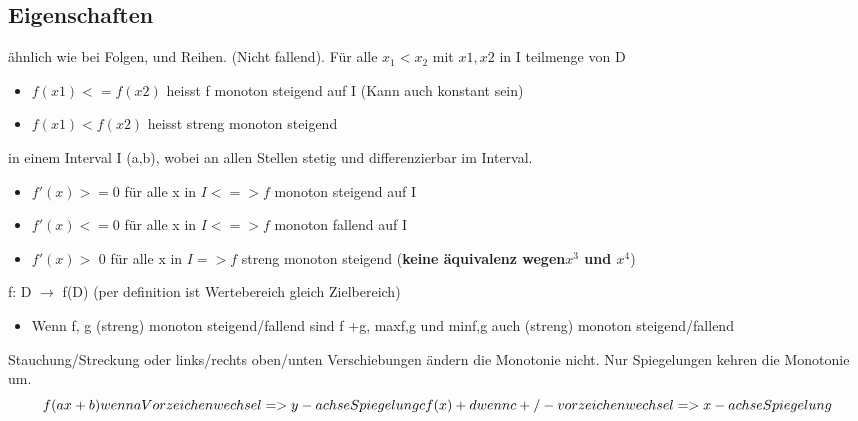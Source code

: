 
\subsection{Eigenschaften}
\begin{definition}
    [Monotonie] ähnlich wie bei Folgen, und Reihen. (Nicht fallend). Für alle $x_1 < x_2$ mit $x1,x2$ in I teilmenge von D
    \begin{itemize}
        \item $f(x1) < = f(x2)$ heisst f monoton steigend auf I (Kann auch konstant sein)
        \item $f(x1) < f(x2)$ heisst streng monoton steigend
    \end{itemize}
\end{definition}

\begin{theorem}
    [Monotoniekriterium] in einem Interval I (a,b), wobei an allen Stellen stetig und differenzierbar im Interval.
    \begin{itemize}
        \item $f'(x) >= 0 $ für alle x in  $I <=> f$ monoton steigend auf I
        \item $f'(x) <= 0 $ für alle x in $I <=> f$ monoton fallend auf I 
        \item $ f'(x) > $ 0 für alle x in $I => f$ streng monoton steigend (\textbf{keine äquivalenz wegen$ x^3 $ und $x^4$})
    \end{itemize}
\end{theorem}

\begin{theorem}
     f: D $\rightarrow$ f(D) (per definition ist Wertebereich gleich Zielbereich)
\end{theorem}

\begin{theorem}
    \begin{itemize}
        \item Wenn f, g (streng) monoton steigend/fallend sind f +g, max{f,g} und min{f,g} auch (streng) monoton steigend/fallend
    \end{itemize}
\end{theorem}

\begin{theorem}
     Stauchung/Streckung oder links/rechts oben/unten Verschiebungen ändern die Monotonie nicht. Nur Spiegelungen kehren die Monotonie um.
    \[
    f(ax + b)  wenn a Vorzeichen wechsel => y-achse Spiegelung \\
     cf(x)+d wenn c +/- vorzeichen wechsel => x-achse Spiegelung
    \] 
\end{theorem}

